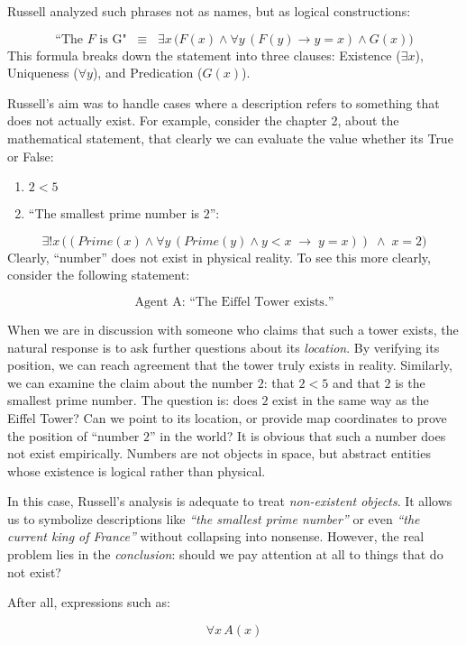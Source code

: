\documentclass[12pt,a4paper,openany]{article}
\begin{document}
Russell analyzed such phrases not as names, but as logical constructions:

$$
\text{“The } F \text{ is G"}\;\;\equiv\;\; \exists x \, \big( F(x) \land \forall y \, (F(y) \to y = x) \land G(x) \big)
$$
This formula breaks down the statement into three clauses: Existence ($\exists x$), Uniqueness ($\forall y$), and Predication ($G(x)$).

Russell’s aim was to handle cases where a description refers to something that does not actually exist. 
For example, consider the chapter 2, about the mathematical statement, that clearly we can evaluate the value whether its True or False:

\begin{enumerate}
    \item $ 2 < 5$
    \item ``The smallest prime number is $2$'':
\end{enumerate}

$$
\exists! x \, \big( (Prime(x) \land \forall y \, (Prime(y) \land y < x \;\to\; y = x)) \;\land\; x = 2 \big)
$$
Clearly, ``number'' does not exist in physical reality. To see this more clearly, consider the following statement:

$$
\text{Agent A: “The Eiffel Tower exists.”}
$$

When we are in discussion with someone who claims that such a tower exists, the natural response is to ask further questions about its \textit{location}. 
By verifying its position, we can reach agreement that the tower truly exists in reality. 
Similarly, we can examine the claim about the number $2$: that $2 < 5$ and that $2$ is the smallest prime number. 
The question is: does $2$ exist in the same way as the Eiffel Tower? Can we point to its location, or provide map coordinates to prove the position of ``number $2$'' in the world? It is obvious that such a number does not exist empirically.
Numbers are not objects in space, but abstract entities whose existence is logical rather than physical.

In this case, Russell’s analysis is adequate to treat \textit{non-existent objects}. 
It allows us to symbolize descriptions like \textit{``the smallest prime number''} or even \textit{``the current king of France''} without collapsing into nonsense.
 However, the real problem lies in the \textit{conclusion}: should we pay attention at all to things that do not exist?

After all, expressions such as:

$$
\forall x \, A(x)
$$
\end{document}
